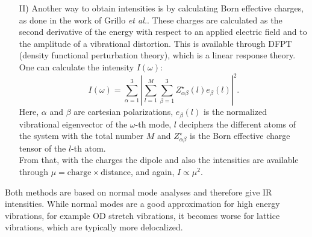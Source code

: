 \documentclass[11pt,DIV=13,BCOR=5mm,a4paper,headinclude]{scrbook}
\begin{document}
\begin{itemize}
\item[II)] Another way to obtain intensities is by calculating Born effective charges\cite{Born1954}, as done in the work of Grillo \textit{et al.}\cite{BEC}.
These charges are calculated as the second derivative of the energy with respect to an applied electric field and to the amplitude of a vibrational distortion.
This is available through DFPT\cite{Baroni1987,Giannozzi1991} (density functional perturbation theory), which is a linear response theory.
One can calculate the intensity $I(\omega)$\cite{Bruesch1986,Baroni2001}:
\begin{equation}
  I(\omega) = \sum_{\alpha=1}^3|\sum_{l=1}^M\sum_{\beta=1}^3 Z_{\alpha\beta}^\star(l)e_\beta(l)|^2.
\end{equation}
Here, $\alpha$ and $\beta$ are cartesian polarizations, $e_\beta(l)$ is the normalized vibrational eigenvector of the $\omega$-th mode, $l$ deciphers the different atoms of the system with the total number $M$ and $Z_{\alpha\beta}^\star$ is the Born effective charge tensor of the $l$-th atom.\\
From that, with the charges the dipole and also the intensities are available through $\mu=\textrm{charge} \times \textrm{distance}$, and again, $I\propto \mu^2$.
\end{itemize}
Both methods are based on normal mode analyses and therefore give IR intensities.
While normal modes are a good approximation for high energy vibrations, for example OD stretch vibrations, it becomes worse for lattice vibrations, which are typically more delocalized.
\end{document}
